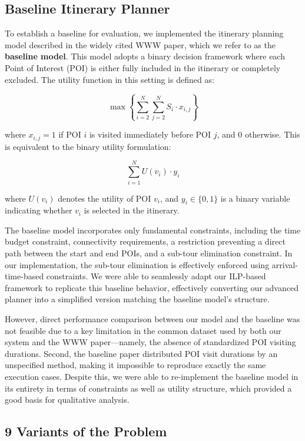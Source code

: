 \subsection{Baseline Itinerary Planner}

To establish a baseline for evaluation, we implemented the itinerary planning model described in the widely cited WWW paper, which we refer to as the \textbf{baseline model}. This model adopts a binary decision framework where each Point of Interest (POI) is either fully included in the itinerary or completely excluded. The utility function in this setting is defined as:

\[
\max \left\{ \sum_{i=2}^{N} \sum_{j=2}^{N} S_i \cdot x_{i,j} \right\}
\]

where \( x_{i,j} = 1 \) if POI \( i \) is visited immediately before POI \( j \), and 0 otherwise. This is equivalent to the binary utility formulation:

\[
\sum_{i=1}^{N} U(v_i) \cdot y_i
\]

where \( U(v_i) \) denotes the utility of POI \( v_i \), and \( y_i \in \{0,1\} \) is a binary variable indicating whether \( v_i \) is selected in the itinerary.

The baseline model incorporates only fundamental constraints, including the time budget constraint, connectivity requirements, a restriction preventing a direct path between the start and end POIs, and a sub-tour elimination constraint. In our implementation, the sub-tour elimination is effectively enforced using arrival-time-based constraints. We were able to seamlessly adapt our ILP-based framework to replicate this baseline behavior, effectively converting our advanced planner into a simplified version matching the baseline model's structure.

However, direct performance comparison between our model and the baseline was not feasible due to a key limitation in the common dataset used by both our system and the WWW paper---namely, the absence of standardized POI visiting durations. Second, the baseline paper distributed POI visit durations by an unspecified method, making it impossible to reproduce exactly the same execution cases. Despite this, we were able to re-implement the baseline model in its entirety in terms of constraints as well as utility structure, which provided a good basis for qualitative analysis.

\subsection{9 Variants of the Problem}

